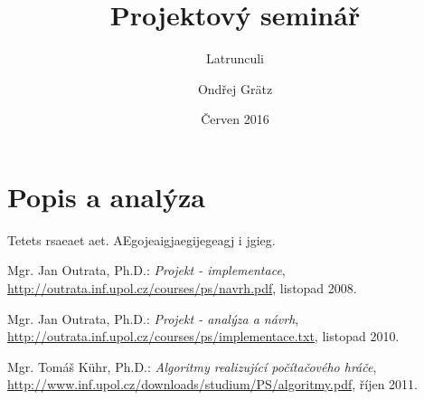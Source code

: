 \documentclass[12pt]{article}
\title{Projektový seminář}
\subtitle{Latrunculi}
\author{Ondřej Grätz}
\date{Červen 2016}
\begin{document}
\maketitle

\newpage
\section{Popis a analýza}
Tetets rsaeaet aet.
AEgojeaigjaegijegeagj i jgieg.

\newpage
\begin{thebibliography}{10}

	
 Mgr. Jan Outrata, Ph.D.: \emph{Projekt - implementace},
 \url{http://outrata.inf.upol.cz/courses/ps/navrh.pdf},
			listopad 2008.

	
 Mgr. Jan Outrata, Ph.D.: \emph{Projekt - analýza a návrh},
 \url{http://outrata.inf.upol.cz/courses/ps/implementace.txt},
			listopad 2010.

 Mgr. Tomáš Kühr, Ph.D.: \emph{Algoritmy realizující počítačového hráče},
 \url{http://www.inf.upol.cz/downloads/studium/PS/algoritmy.pdf},
			říjen 2011.

\end{thebibliography} 
\end{document}
